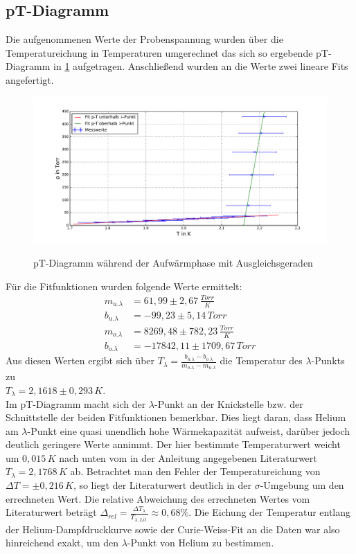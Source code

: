 \documentclass[twoside,colorback,accentcolor=tud4c,11pt]{tudreport}
\begin{document}
\subsection{pT-Diagramm}
Die aufgenommenen Werte der Probenspannung wurden über die Temperatureichung in Temperaturen umgerechnet das sich so ergebende pT-Diagramm in \ref{pTdia} aufgetragen. Anschließend wurden an die Werte zwei lineare Fits angefertigt.
\begin{figure}[H]
\centering
   	\begin{minipage}[b]{1.0\textwidth}
   	\includegraphics[width=\textwidth]{graphics/pT.pdf}
  	\label{pTdia}
   	\end{minipage}
\caption{pT-Diagramm während der Aufwärmphase mit Ausgleichsgeraden}	
\end{figure}
Für die Fitfunktionen wurden folgende Werte ermittelt:
\begin{align}
m_{u.\lambda}&=61,99\pm 2,67 \,\si{\frac{Torr}{K}}\\
b_{u.\lambda}&=-99,23\pm 5,14\,\si{Torr}\\
m_{o.\lambda}&=8269,48\pm 782,23 \,\si{\frac{Torr}{K}}\\
b_{o.\lambda}&=-17842,11\pm 1709,67\,\si{Torr}
\end{align}
Aus diesen Werten ergibt sich über $T_{\lambda}=\frac{b_{u.\lambda}-b_{o.\lambda}}{m_{o.\lambda}-m_{u.\lambda}}$ die Temperatur des $\lambda$-Punkts zu\\ $T_{\lambda}=2,1618\pm 0,293\,\si{K}$.\\
Im pT-Diagramm macht sich der $\lambda$-Punkt an der Knickstelle bzw. der Schnittstelle der beiden Fitfunktionen bemerkbar. Dies liegt daran, dass Helium am $\lambda$-Punkt eine quasi unendlich hohe Wärmekapazität aufweist, darüber jedoch deutlich geringere Werte annimmt. Der hier bestimmte Temperaturwert  weicht um $0,015\,\si{K}$ nach unten vom in der Anleitung angegebenen Literaturwert $T_{\lambda}=2,1768\,\si{K}$ ab. Betrachtet man den Fehler der Temperatureichung von $\Delta T=\pm 0,216\,\si{K}$, so liegt der Literaturwert deutlich in der $\sigma$-Umgebung um den errechneten Wert. Die relative Abweichung des errechneten Wertes vom Literaturwert beträgt $\Delta_{rel}=\frac{\Delta T_{\lambda}}{T_{\lambda ,Lit.}}\approx 0,68\%.$ Die Eichung der Temperatur entlang der Helium-Dampfdruckkurve sowie der Curie-Weiss-Fit an die Daten war also hinreichend exakt, um den $\lambda$-Punkt von Helium zu bestimmen.
\end{document}
